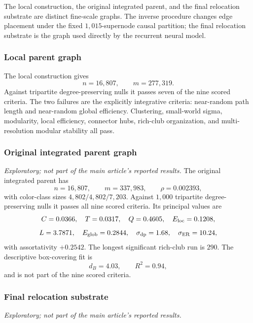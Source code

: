 \documentclass[12pt]{article}
\begin{document}
The local construction, the original integrated parent, and the final
relocation substrate are distinct fine-scale graphs.  The inverse procedure
changes edge placement under the fixed \(1{,}015\)-supernode causal partition;
the final relocation substrate is the graph used directly by the recurrent
neural model.

\subsubsection{Local parent graph}
The local construction gives
\[
n=16{,}807,\qquad m=277{,}319.
\]
Against tripartite degree-preserving nulls it passes seven of the nine scored
criteria.  The two failures are the explicitly integrative criteria:
near-random path length and near-random global efficiency.  Clustering,
small-world sigma, modularity, local efficiency, connector hubs, rich-club
organization, and multi-resolution modular stability all pass.

\subsubsection{Original integrated parent graph}
\emph{Exploratory; not part of the main article's reported results.}
The original integrated parent has
\[
n=16{,}807,\qquad m=337{,}983,\qquad \rho=0.002393,
\]
with color-class sizes \(4{,}802/4{,}802/7{,}203\).  Against \(1{,}000\)
tripartite degree-preserving nulls it passes all nine scored criteria.  Its
principal values are
\[
C=0.0366,\quad T=0.0317,\quad Q=0.4605,\quad
E_{\rm loc}=0.1208,
\]
\[
L=3.7871,\quad E_{\rm glob}=0.2844,\quad
\sigma_{\rm dp}=1.68,\quad\sigma_{\rm ER}=10.24,
\]
with assortativity \(+0.2542\).  The longest significant rich-club run is
\(290\).  The descriptive box-covering fit is
\[
d_B=4.03,\qquad R^2=0.94,
\]
and is not part of the nine scored criteria.

\subsubsection{Final relocation substrate}
\emph{Exploratory; not part of the main article's reported results.}
\end{document}
